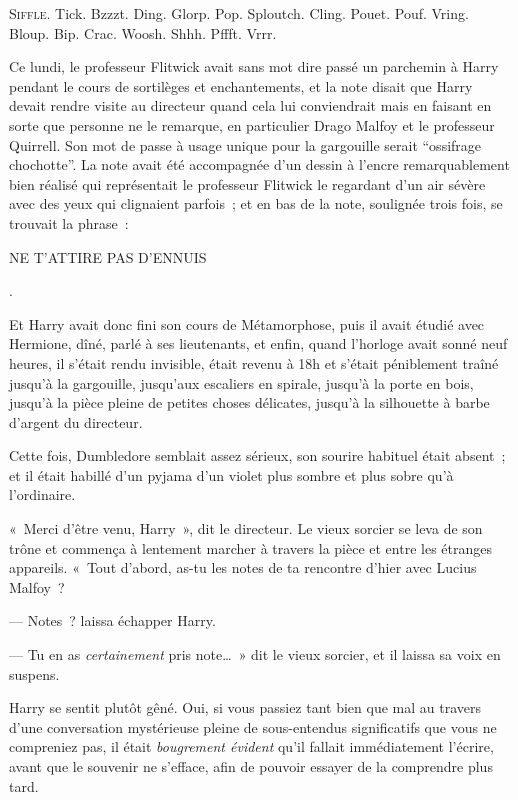 
\lettrine{S}{iffle}.  Tick. Bzzzt. Ding. Glorp. Pop. Sploutch. Cling. Pouet. Pouf. Vring. Bloup. Bip. Crac. Woosh. Shhh. Pffft. Vrrr.

Ce lundi, le professeur Flitwick avait sans mot dire passé un parchemin à Harry pendant le cours de sortilèges et enchantements, et la note disait que Harry devait rendre visite au directeur quand cela lui conviendrait mais en faisant en sorte que personne ne le remarque, en particulier Drago Malfoy et le professeur Quirrell. Son mot de passe à usage unique pour la gargouille serait “ossifrage chochotte”. La note avait été accompagnée d'un dessin à l'encre remarquablement bien réalisé qui représentait le professeur Flitwick le regardant d'un air sévère avec des yeux qui clignaient parfois~; et en bas de la note, soulignée trois fois, se trouvait la phrase~: \begin{writtenNote}NE T'ATTIRE PAS D'ENNUIS\end{writtenNote}.

Et Harry avait donc fini son cours de Métamorphose, puis il avait étudié avec Hermione, dîné, parlé à ses lieutenants, et enfin, quand l'horloge avait sonné neuf heures, il s'était rendu invisible, était revenu à 18h et s'était péniblement traîné jusqu'à la gargouille, jusqu'aux escaliers en spirale, jusqu'à la porte en bois, jusqu'à la pièce pleine de petites choses délicates, jusqu'à la silhouette à barbe d'argent du directeur.

Cette fois, Dumbledore semblait assez sérieux, son sourire habituel était absent~; et il était habillé d'un pyjama d'un violet plus sombre et plus sobre qu'à l'ordinaire.

«~Merci d'être venu, Harry~», dit le directeur. Le vieux sorcier se leva de son trône et commença à lentement marcher à travers la pièce et entre les étranges appareils. «~Tout d'abord, as-tu les notes de ta rencontre d'hier avec Lucius Malfoy~?

--- Notes~? laissa échapper Harry.

--- Tu en as \emph{certainement} pris note…~» dit le vieux sorcier, et il laissa sa voix en suspens.

Harry se sentit plutôt gêné. Oui, si vous passiez tant bien que mal au travers d'une conversation mystérieuse pleine de sous-entendus significatifs que vous ne compreniez pas, il était \emph{bougrement évident} qu'il fallait immédiatement l'écrire, avant que le souvenir ne s'efface, afin de pouvoir essayer de la comprendre plus tard.

